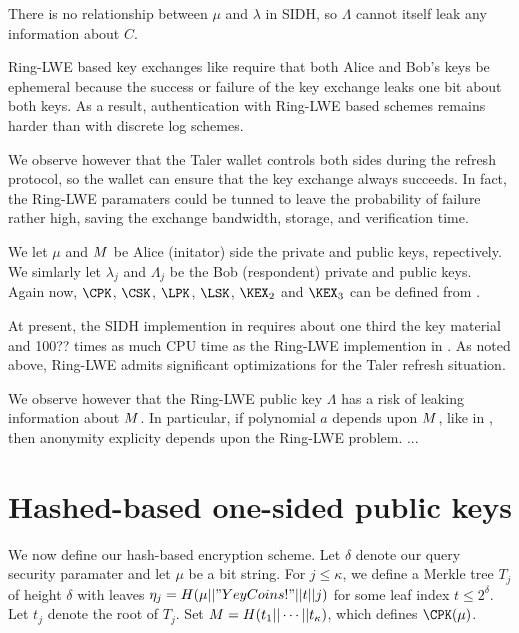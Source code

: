 \documentclass{llncs}
\begin{document}
There is no relationship between $\mu$ and $\lambda$ in SIDH, so
$\Lambda$ cannot itself leak any information about $C$.

\smallskip

Ring-LWE based key exchanges like \cite{Peikert14,NewHope} require
that both Alice and Bob's keys be ephemeral because the success or
failure of the key exchange leaks one bit about both keys\cite{}.
As a result, authentication with Ring-LWE based schemes remains
harder than with discrete log schemes\cite{}.

We observe however that the Taler wallet controls both sides during 
the refresh protocol, so the wallet can ensure that the key exchange 
always succeeds.  In fact, the Ring-LWE paramaters could be tunned to
leave the probability of failure rather high, saving the exchange
bandwidth, storage, and verification time.  

We let $\mu$ and $M$ be Alice (initator) side the private and public
keys, repectively.  We simlarly let $\lambda_j$ and $\Lambda_j$ be the
Bob (respondent) private and public keys. 
Again now, $\CPK$, $\CSK$, $\LPK$, $\LSK$, $\KEX_2$ and $\KEX_3$
can be defined from \cite{Peikert14,NewHope}.  

\smallskip

At present, the SIDH implemention in \cite{SIDH16} requires about
one third the key material and 100?? times as much CPU time as the
Ring-LWE implemention in \cite{NewHope}.
As noted above, Ring-LWE admits significant optimizations for the
Taler refresh situation.

We observe however that the Ring-LWE public key $\Lambda$ has a risk
of leaking information about $M$.  In particular, if polynomial $a$
depends upon $M$, like in \cite{NewHope}, then anonymity explicity
depends upon the Ring-LWE problem\cite{}.  
...


\section{Hashed-based one-sided public keys}

We now define our hash-based encryption scheme.
Let $\delta$ denote our query security paramater and
 let $\mu$ be a bit string.
For $j \le \kappa$, we define a Merkle tree $T_j$ of height $\delta$
with leaves $\eta_j = H(\mu || "YeyCoins!" || t || j)$
 for some leaf index $t \le 2^\delta$. 
Let $t_j$ denote the root of $T_j$.
Set $M = H(t_1 || \cdots || t_\kappa)$,
 which defines $\CPK(\mu)$.
\end{document}
